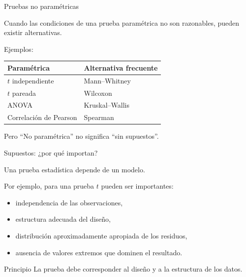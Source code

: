 \documentclass[aspectratio=169,11pt]{beamer}
\begin{document}
\begin{frame}{Pruebas no paramétricas}

Cuando las condiciones de una prueba paramétrica no son razonables,
pueden existir alternativas.

Ejemplos:

\begin{center}
\begin{tabular}{ll}
\toprule
Paramétrica & Alternativa frecuente\\
\midrule
$t$ independiente & Mann--Whitney\\
$t$ pareada & Wilcoxon\\
ANOVA & Kruskal--Wallis\\
Correlación de Pearson & Spearman\\
\bottomrule
\end{tabular}
\end{center}

\begin{alertblock}{Pero}
``No paramétrica'' no significa ``sin supuestos''.
\end{alertblock}

\end{frame}

\begin{frame}{Supuestos: ¿por qué importan?}

Una prueba estadística depende de un modelo.

Por ejemplo, para una prueba $t$ pueden ser importantes:

\begin{itemize}
    \item independencia de las observaciones,
    \item estructura adecuada del diseño,
    \item distribución aproximadamente apropiada de los residuos,
    \item ausencia de valores extremos que dominen el resultado.
\end{itemize}

\begin{block}{Principio}
La prueba debe corresponder al diseño y a la estructura de los datos.
\end{block}

\end{frame}
\end{document}
